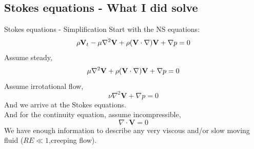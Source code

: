 \documentclass[compress]{beamer}
\begin{document}

\subsection{Stokes equations - What I did solve}
\begin{frame}{Stokes equations - Simplification}
\pause
Start with the NS equations:
$$\rho {\bf V}_t - \mu \nabla^2 {\bf V} + \rho ({\bf V}  \cdot \nabla ) {\bf V} 
    + \nabla p = 0 \label{eqn:ns}$$
    \pause
Assume steady,
$$\mu\nabla^2 {\bf V} + \rho ({\bf V}  \cdot \nabla ) {\bf V} + \nabla p = 0 \label{eqn:ns}$$
    \pause
Assume irrotational flow,
\begin{equation}\nu\nabla^2 \mathbf {V} + \nabla p = 0%
\end{equation}
And we arrive at the \alert{Stokes equations}.\\\pause
And for the continuity equation, assume incompressible,
    \pause
\begin{equation}\nabla \cdot\mathbf{V} = 0%
\end{equation}
We have enough information to describe any \alert{very} viscous and/or slow moving fluid ($RE\ll 1$,creeping flow).
\end{frame}
\end{document}
